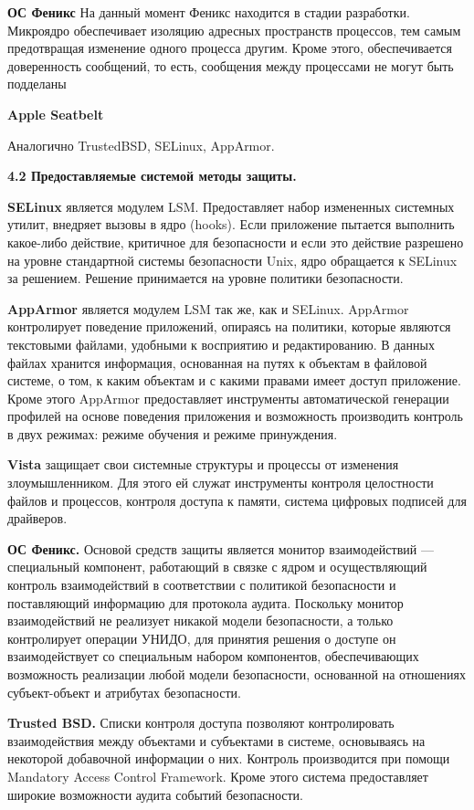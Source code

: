\bigskip
{\bfseries ОС Феникс }
На данный момент Феникс находится в стадии разработки. Микроядро обеспечивает изоляцию адресных пространств процессов, тем самым предотвращая изменение одного процесса другим. Кроме этого, обеспечивается доверенность сообщений, то есть, сообщения между процессами не могут быть подделаны 

\bigskip
{\bfseries Apple Seatbelt}

Аналогично TrustedBSD, SELinux, AppArmor.

\bigskip
{\bfseries 4.2 Предоставляемые системой методы защиты.}

\bigskip
{\bfseries SELinux} является модулем LSM. Предоставляет набор измененных системных утилит, внедряет вызовы в ядро (hooks). Если приложение пытается выполнить какое-либо действие, критичное для безопасности и если это действие разрешено на уровне стандартной системы безопасности Unix, ядро обращается к SELinux за решением. Решение принимается на уровне политики безопасности. 

\bigskip
{\bfseries AppArmor} является модулем LSM так же, как и SELinux. AppArmor контролирует поведение приложений, опираясь на политики, которые являются текстовыми файлами, удобными к восприятию и редактированию. В данных файлах хранится информация, основанная на путях к объектам в файловой системе, о том, к каким объектам и с какими правами имеет доступ приложение. Кроме этого AppArmor предоставляет инструменты автоматической генерации профилей на основе поведения приложения и возможность производить контроль в двух режимах: режиме обучения и режиме принуждения. 

\bigskip
{\bfseries Vista} защищает свои системные структуры и процессы от изменения злоумышленником. Для этого ей служат инструменты контроля целостности файлов и процессов, контроля доступа к памяти, система цифровых подписей для драйверов. 

\bigskip
{\bfseries ОС Феникс.} Основой средств защиты является монитор взаимодействий — специальный компонент, работающий в связке с ядром и осуществляющий контроль взаимодействий в соответствии с политикой безопасности и поставляющий информацию для протокола аудита. Поскольку монитор взаимодействий не реализует никакой модели безопасности, а только контролирует операции УНИДО, для принятия решения о доступе он взаимодействует со специальным набором компонентов, обеспечивающих возможность реализации любой модели безопасности, основанной на отношениях субъект-объект и атрибутах безопасности. 

\bigskip
{\bfseries Trusted BSD.} Списки контроля доступа позволяют контролировать взаимодействия между объектами и субъектами в системе, основываясь на некоторой добавочной информации о них. Контроль производится при помощи Mandatory Access Control Framework. Кроме этого система предоставляет широкие возможности аудита событий безопасности. 

